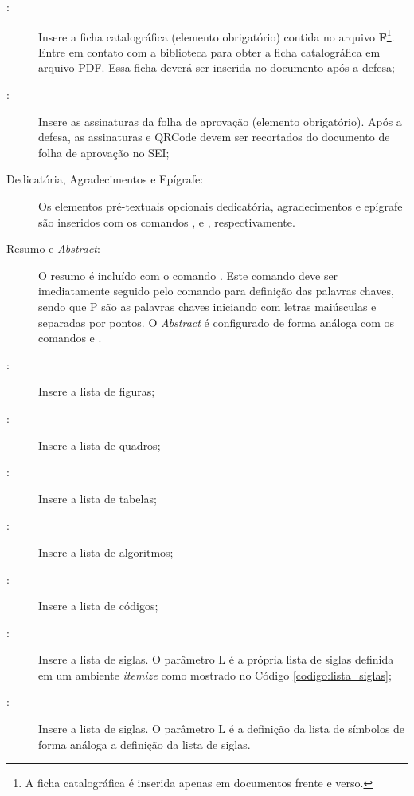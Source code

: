 \begin{description}
\item[:] Insere a ficha catalográfica (elemento obrigatório) contida no arquivo \textbf{F}\footnote{A ficha catalográfica é inserida apenas em documentos frente e verso.}.
Entre em contato com a biblioteca para obter a ficha catalográfica em arquivo PDF.
Essa ficha deverá ser inserida no documento após a defesa;
\item[:] Insere as assinaturas da folha de aprovação (elemento obrigatório).
Após a defesa, as assinaturas e QRCode devem ser recortados do documento de folha de aprovação no SEI;
\item[Dedicatória, Agradecimentos e Epígrafe:] Os elementos pré-textuais opcionais dedicatória, agradecimentos e epígrafe são inseridos com os comandos ,  e , respectivamente.

\item[Resumo e \textit{Abstract}:] O resumo é incluído com o comando . Este comando deve ser imediatamente seguido pelo comando  para definição das palavras chaves, sendo que P são as palavras chaves iniciando com letras maiúsculas e separadas por pontos. O \textit{Abstract} é configurado de forma análoga com os comandos  e .
\item[:] Insere a lista de figuras;
\item[:] Insere a lista de quadros;
\item[:] Insere a lista de tabelas;
\item[:] Insere a lista de algoritmos;
\item[:] Insere a lista de códigos;
\item[:] Insere a lista de siglas. O parâmetro L é a própria lista de siglas definida em um ambiente \textit{itemize} como mostrado no Código \ref{codigo:lista_siglas};
\item[:] Insere a lista de siglas. O parâmetro L é a definição da lista de símbolos de forma análoga a definição da lista de siglas.
\end{description}

